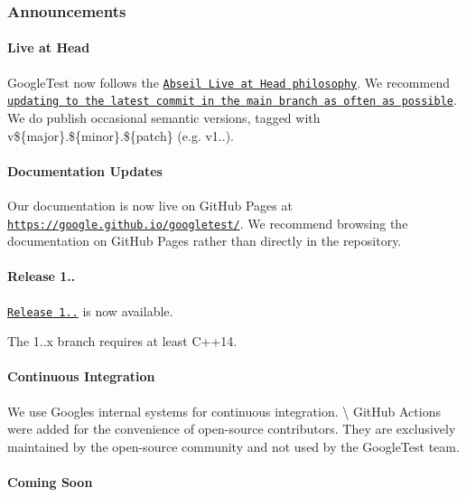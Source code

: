 \subsubsection*{Announcements}

\paragraph*{Live at Head}

Google\+Test now follows the \href{https://abseil.io/about/philosophy#upgrade-support}{\tt Abseil Live at Head philosophy}. We recommend \href{https://github.com/abseil/abseil-cpp/blob/master/FAQ.md#what-is-live-at-head-and-how-do-i-do-it}{\tt updating to the latest commit in the {\ttfamily main} branch as often as possible}. We do publish occasional semantic versions, tagged with {\ttfamily v\$\{major\}.\$\{minor\}.\$\{patch\}} (e.\+g. {\ttfamily v1..}).

\paragraph*{Documentation Updates}

Our documentation is now live on Git\+Hub Pages at \href{https://google.github.io/googletest/}{\tt https\+://google.\+github.\+io/googletest/}. We recommend browsing the documentation on Git\+Hub Pages rather than directly in the repository.

\paragraph*{Release 1..}

\href{https://github.com/google/googletest/releases/tag/v1.14.0}{\tt Release 1..} is now available.

The 1..\+x branch requires at least C++14.

\paragraph*{Continuous Integration}

We use Google\textquotesingle{}s internal systems for continuous integration. \textbackslash{} Git\+Hub Actions were added for the convenience of open-\/source contributors. They are exclusively maintained by the open-\/source community and not used by the Google\+Test team.

\paragraph*{Coming Soon}


